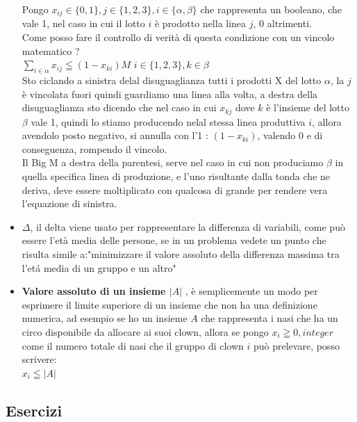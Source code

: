 \documentclass{article}
\begin{document}
\begin{itemize}
Pongo $x_{ij} \in \{0,1\}, j \in \{1,2,3\}, i \in \{\alpha,\beta\} $ che rappresenta un booleano, che vale 1, nel caso in cui il lotto $i$ è prodotto nella linea $j$, 0 altrimenti.\\
Come posso fare il controllo di verità di questa condizione con un vincolo matematico ?\\
$\displaystyle \sum_{i \in \alpha} x_{ij} \leqq (1-x_{ki})M$ $i \in \{1,2,3\}, k \in \beta$\\
Sto ciclando a sinistra delal disuguaglianza tutti i prodotti X del lotto $\alpha$, la $j$ è vincolata fuori quindi guardiamo una linea alla volta, a destra della disuguaglianza sto dicendo che nel caso in cui $x_{kj}$ dove $k$ è l'insieme del lotto $\beta$ vale 1, quindi lo stiamo producendo nelal stessa linea produttiva $i$, allora avendolo posto negativo, si annulla con l'1 : $(1-x_{ki})$, valendo 0 e di conseguenza, rompendo il vincolo.\\
Il Big M a destra della parentesi, serve nel caso in cui non produciamo $\beta$ in quella specifica linea di produzione, e l'uno risultante dalla tonda che ne deriva, deve essere moltiplicato con qualcosa di grande per rendere vera l'equazione di sinistra.

\item \textbf{$\Delta$}, il delta viene usato per rappresentare la differenza di variabili, come può essere l'età media delle persone, se in un problema vedete un punto che risulta simile a:"minimizzare il valore assoluto della differenza massima tra l'etá media di un gruppo e un altro"

\item \textbf{Valore assoluto di un insieme $|A|$ }, è semplicemente un modo per esprimere il limite superiore di un insieme che non ha una definizione numerica, ad esempio se ho un insieme $A$ che rappresenta i nasi che ha un circo disponibile da allocare ai suoi clown, allora se pongo $x_i \geqq 0, integer$ come il numero totale di nasi che il gruppo di clown $i$ può prelevare, posso scrivere:\\
$x_i \leqq |A|$
\end{itemize}
\newpage
\subsection{Esercizi}
\end{document}
